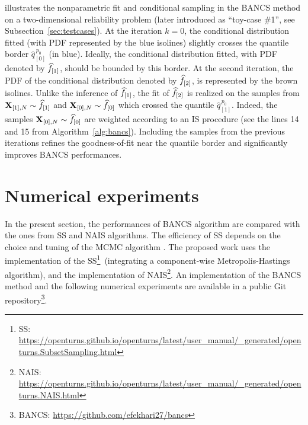  illustrates the nonparametric fit and conditional sampling in the BANCS method on a two-dimensional reliability problem (later introduced as ``toy-case \#1'', see Subsection~\ref{sec:testcases}). 
At the iteration $k=0$, the conditional distribution fitted (with PDF represented by the blue isolines) slightly crosses the quantile border $\widehat{q}_{[0]}^{\, p_0}$ (in blue). 
Ideally, the conditional distribution fitted, with PDF denoted by $\widehat{f}_{[1]}$, should be bounded by this border. 
At the second iteration, the PDF of the conditional distribution denoted by $\widehat{f}_{[2]}$, is represented by the brown isolines. 
Unlike the inference of $\widehat{f}_{[1]}$, the fit of $\widehat{f}_{[2]}$ is realized on the samples from ${\bf X}_{[1], N} \sim \widehat{f}_{[1]}$ and ${\bf X}_{[0], N} \sim \widehat{f}_{[0]}$ which crossed the quantile $\widehat{q}_{[1]}^{\, p_0}$. 
Indeed, the samples ${\bf X}_{[0], N} \sim \widehat{f}_{[0]}$ are weighted according to an IS procedure (see the lines 14 and 15 from Algorithm~\ref{alg:bancs}). 
Including the samples from the previous iterations refines the goodness-of-fit near the quantile border and significantly improves BANCS performances. 


\section{Numerical experiments}\label{sec:bancs_bench}
In the present section, the performances of BANCS algorithm are compared with the ones from SS and NAIS algorithms. 
The efficiency of SS depends on the choice and tuning of the MCMC algorithm \citep{Papaioannou_PEM_2015}. 
The proposed work uses the \ots implementation of the SS\footnote{SS: \url{https://openturns.github.io/openturns/latest/user_manual/_generated/openturns.SubsetSampling.html}}~(integrating a component-wise Metropolis-Hastings algorithm), 
and the \ots implementation of NAIS\footnote{NAIS: \url{https://openturns.github.io/openturns/latest/user_manual/_generated/openturns.NAIS.html}}.
An implementation of the BANCS method and the following numerical experiments are available in a public Git repository\footnote{BANCS: \url{https://github.com/efekhari27/bancs}}. 

